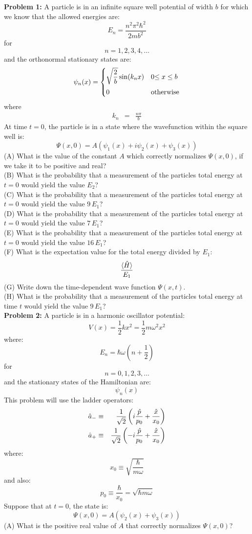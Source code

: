 \documentclass[12pt]{article}
\begin{document}
\noindent
{\bf Problem 1:}
A particle is in an infinite square well potential of width $b$ for which we know that the allowed energies are:
$$E_n = \frac{n^2 \pi^2 \hbar^2}{2mb^2}$$
for
$$n=1,2,3,4,\ldots$$
and the orthonormal stationary states are:
$$
\psi_n(x) = 
\begin{cases}    
   {\displaystyle \sqrt{\frac{2}{b}}\sin(k_n x)} & 0 {\displaystyle \leq x \leq b} \\[8pt]
   0 & {\rm otherwise} \\
\end{cases}   
$$
where
\begin{eqnarray*}
k_n&=&\frac{n\pi}{b}
\end{eqnarray*}
At time $t=0$, the particle is in a state where the wavefunction within the square well is:
$$\Psi(x,0) = A\left( \psi_1(x) + i\psi_2(x) + \psi_3(x) \right)$$
\noindent
(A) What is the value of the constant $A$ which correctly normalizes $\Psi(x,0)$, if we take it to be positive and real?\\[5pt]
(B) What is the probability that a measurement of the particles total energy at $t=0$ would yield the value $E_2$?\\[5pt]
(C) What is the probability that a measurement of the particles total energy at $t=0$ would yield the value $9\,E_1$?\\[5pt]
(D) What is the probability that a measurement of the particles total energy at $t=0$ would yield the value $7\,E_1$?\\[5pt]
(E) What is the probability that a measurement of the particles total energy at $t=0$ would yield the value $16\,E_1$?\\[5pt]
(F) What is the expectation value for the total energy divided by $E_1$:
$$\frac{\braket{\hat{H}}}{E_1}$$
(G) Write down the time-dependent wave function $\Psi(x,t)$.\\[5pt]
(H) What is the probability that a measurement of the particles total energy at time $t$ would yield the value $9\,E_1$?\\[5pt]

\noindent
{\bf Problem 2:}
A particle is in a harmonic oscillator potential:
$$V(x) = \frac{1}{2}k x^2 = \frac{1}{2} m \omega^2 x^2$$
where:
\begin{equation}
E_n = \hbar \omega \left( n + \frac{1}{2} \right)
\end{equation}
for
$$n=0,1,2,3,\ldots$$
and the stationary states of the Hamiltonian are:
$$\psi_n(x)$$
This problem will use the ladder operators:
\begin{eqnarray}
\hat{a}_- &\equiv& \frac{1}{\sqrt{2}}\left(i \frac{\hat{p}}{p_0} + \frac{\hat{x}}{x_0}\right) \notag \\
\hat{a}_+ &\equiv& \frac{1}{\sqrt{2}}\left(-i \frac{\hat{p}}{p_0} + \frac{\hat{x}}{x_0} \right) \notag \\
\end{eqnarray}
where:
$$x_0 \equiv \sqrt{\frac{\hbar}{m \omega}}$$
and also:
$$p_0 \equiv \frac{\hbar}{x_0} = \sqrt{\hbar m \omega}$$
Suppose that at $t=0$, the state is:
$$\Psi(x,0) = A \left( \psi_2(x) + \psi_3(x)\right)$$
\noindent
(A) What is the positive real value of $A$ that correctly normalizes $\Psi(x,0)$?\\[5pt]
\end{document}
